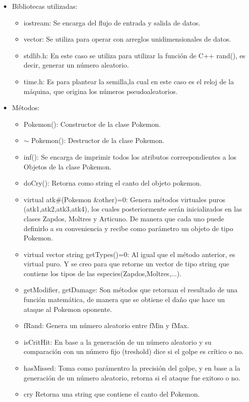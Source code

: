 \documentclass[11pt]{article}
\begin{document}
\begin{itemize}
\begin{itemize}
\item Bibliotecas utilizadas:
\begin{itemize}
\item iostream: Se encarga del flujo de entrada y salida de datos.
\item vector: Se utiliza para operar con arreglos unidimensionales de datos.
\item stdlib.h: En este caso se utiliza para utilizar la funci\'on de C++ rand(), es decir, generar un n\'umero aleatorio.
\item time.h: Es para plantear la semilla,la cual en este caso es el reloj de la m\'aquina, que origina los n\'umeros pseudoaleatorios. 
\end{itemize}
\item M\'etodos:
\begin{itemize}
\item Pokemon():
Constructor de la clase Pokemon.
\item $\sim$ Pokemon():
Destructor de la clase Pokemon.
\item inf():
Se encarga de imprimir todos los atributos correspondientes a los Objetos de la clase Pokemon.
\item doCry():
Retorna como string el canto del objeto pokemon.
\item virtual atk\#(Pokemon \&other)=0:
Genera m\'etodos virtuales puros (atk1,atk2,atk3,atk4), los cuales posteriormente ser\'an inicializados en las clases Zapdos, Moltres y Articuno. De manera que cada uno puede definirlo a su conveniencia y recibe como par\'ametro un objeto de tipo Pokemon.
\item virtual vector string getTypes()=0:
Al igual que el m\'etodo anterior, es virtual puro. Y se creo para que retorne un vector de tipo string que contiene los tipos de las especies(Zapdos,Moltres,...).
\item getModifier, getDamage:
Son m\'etodos que retornan el resultado de una funci\'on matem\'atica, de manera que se obtiene el da\~no que hace un ataque al Pokemon oponente. 
\item fRand: 
Genera un n\'umero aleatorio entre fMin y fMax.
\item isCritHit:
En base a la generaci\'on de un n\'umero aleatorio y su comparaci\'on con un n\'umero fijo (treshold) dice si el golpe es cr\'itico o no.
\item hasMissed:
Toma como par\'amentro la precisi\'on del golpe, y en base a la generaci\'on de un n\'umero aleatorio, retorna si el ataque fue exitoso o no.
\item cry
Retorna una string que contiene el canto del Pokemon.
\end{itemize}
\end{itemize}
\end{itemize}
\end{document}
